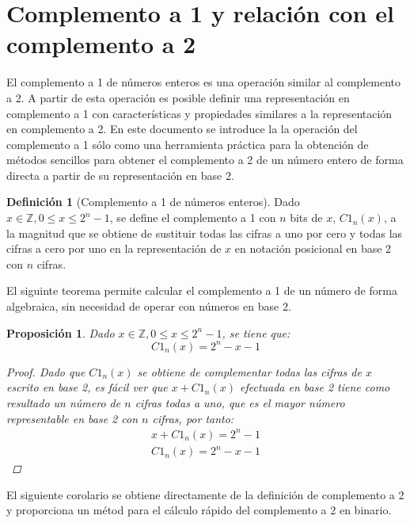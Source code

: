 \documentclass[spanish,a4paper,12pt,titlepage]{article}
\newtheorem{proposition}[theorem]{Proposición}
\theoremstyle{definition}
\newtheorem{definition}{Definición}%
\theoremstyle{remark}
\newcommand{\bbZ}{\mathbb{Z}}
\begin{document}
\section{Complemento a 1 y relación con el complemento a 2}

El complemento a 1 de números enteros es una operación similar al complemento a 2. A partir de esta operación es posible definir una representación en complemento a 1 con características y propiedades similares a la representación en complemento a 2. En este documento se introduce la la operación del complemento a 1 sólo como una herramienta práctica para la obtención de métodos sencillos para obtener el complemento a 2 de un número entero de forma directa a partir de su representación en base 2.

\begin{definition}[Complemento a 1 de números enteros]\label{def-c1}
  Dado $x \in \bbZ, 0 \le x \le 2^n-1$, se define el complemento a 1 con $n$ bits de $x$, $C1_n(x)$, a la magnitud que se obtiene de sustituir todas las cifras a uno por cero y todas las cifras a cero por uno en la representación de $x$ en notación posicional en base 2 con $n$ cifras.
\end{definition}

El siguinte teorema permite calcular el complemento a 1 de un número de forma algebraica, sin necesidad de operar con números en base 2.

\begin{proposition}
  Dado $x \in \bbZ, 0 \le x \le 2^n-1$, se tiene que:
  \[
    C1_n(x) = 2^n - x - 1
  \]
  \begin{proof}
    Dado que $C1_n(x)$ se obtiene de complementar todas las cifras de $x$ escrito en base 2, es fácil ver que $x+C1_n(x)$ efectuada en base 2 tiene como resultado un número de $n$ cifras todas a uno, que es el mayor número representable en base 2 con $n$ cifras, por tanto:
    \begin{align*}
        x + C1_n(x) = 2^n - 1\\
        C1_n(x) = 2^n - x - 1
    \end{align*}
  \end{proof}
\end{proposition}

El siguiente corolario se obtiene directamente de la definición de complemento a 2 y proporciona un métod para el cálculo rápido del complemento a 2 en binario.
\end{document}
